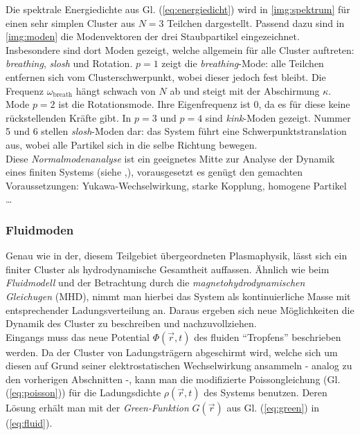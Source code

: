 \documentclass[numbers=noenddot,a4paper]{scrartcl}
\newcommand{\ix}[1]{_\text{#1}}
\newcommand{\tilt}[1]{\textit{#1}}
\begin{document}
					Die spektrale Energiedichte aus Gl. (\ref{eq:energiedicht}) wird in \ref{img:spektrum} für einen sehr simplen Cluster aus $N=3$ Teilchen dargestellt. Passend dazu sind in \ref{img:moden} die Modenvektoren der drei Staubpartikel eingezeichnet. Insbesondere sind dort Moden gezeigt, welche allgemein für alle Cluster auftreten: \tilt{breathing}, \tilt{slosh} und Rotation. $p=1$ zeigt die \tilt{breathing}-Mode: alle Teilchen entfernen sich vom Clusterschwerpunkt, wobei dieser jedoch fest bleibt. Die Frequenz $\omega\ix{breath}$ hängt schwach von $N$ ab und steigt mit der Abschirmung $\kappa$. Mode $p=2$ ist die Rotationsmode. Ihre Eigenfrequenz ist $0$, da es für diese keine rückstellenden Kräfte gibt. In $p=3$ und $p=4$ sind \tilt{kink}-Moden gezeigt. Nummer 5 und 6 stellen \tilt{slosh}-Moden dar: das System führt eine Schwerpunktstranslation aus, wobei alle Partikel sich in die selbe Richtung bewegen.\\
					Diese \tilt{Normalmodenanalyse} ist ein geeignetes Mitte zur Analyse der Dynamik eines finiten Systems (siehe \cite{Melzer01},\cite{Melzer03}), vorausgesetzt es genügt den gemachten Voraussetzungen: Yukawa-Wechselwirkung, starke Kopplung, homogene Partikel \dots

				\subsubsection*{Fluidmoden}

					Genau wie in der, diesem Teilgebiet übergeordneten Plasmaphysik, lässt sich ein finiter Cluster als hydrodynamische Gesamtheit auffassen. Ähnlich wie beim \tilt{Fluidmodell} und der Betrachtung durch die \tilt{magnetohydrodynamischen Gleichugen} (MHD), nimmt man hierbei das System als kontinuierliche Masse mit entsprechender Ladungsverteilung an. Daraus ergeben sich neue Möglichkeiten die Dynamik des Cluster zu beschreiben und nachzuvollziehen.\\
					Eingangs muss das neue Potential $\Phi\left(\vec{r},t\right)$ des fluiden "`Tropfens"' beschrieben werden. Da der Cluster von Ladungsträgern abgeschirmt wird, welche sich um diesen auf Grund seiner elektrostatischen Wechselwirkung ansammeln - analog zu den vorherigen Abschnitten -, kann man die modifizierte Poissongleichung (Gl. (\ref{eq:poisson})) für die Ladungsdichte $\rho\left(\vec{r},t\right)$ des Systems benutzen. Deren Lösung erhält man mit der \tilt{Green-Funktion} $G\left(\vec{r}\right)$ aus Gl. (\ref{eq:green}) in (\ref{eq:fluid}). 
\end{document}
